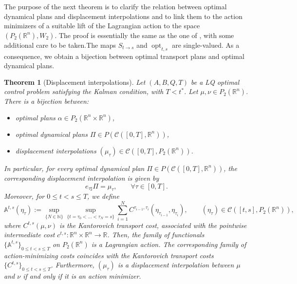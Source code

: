 \documentclass[reqno]{amsart}
\DeclareMathOperator{\opt}{opt}
\theoremstyle{plain}
\newtheorem{thm}{Theorem}[section]
\theoremstyle{definition}
\theoremstyle{remark}
\newcommand{\R}{\mathbb{R}}
\begin{document}
	The purpose of the next theorem is to clarify the relation between optimal dynamical plans and displacement interpolations and to link them to the action minimizers of a suitable lift of the Lagrangian action to the space $(P_2(\mathbb{R}^n),W_2)$. The proof is essentially the same as the one of \cite[Theorem 7.21]{Villanioldandnew}, with some additional care to be taken.The maps $S_{t\to s}$ and $\opt_{t,s}$ are single-valued. As a consequence, we obtain a bijection between optimal transport plans and optimal dynamical plans.
	
	\begin{thm}[Displacement interpolations]\label{dyn_opt_coup_characterization}
		Let $(A,B,Q,T)$ be a LQ optimal control problem satisfying the Kalman condition, with $T<t^*$. Let $\mu, \nu\in P_2(\mathbb{R}^n)$. There is a bijection between:
        \begin{itemize}
            \item optimal plans $\alpha\in P_2(\mathbb{R}^n\times\mathbb{R}^n)$,
            \item optimal dynamical plans $\Pi\in P(\mathcal{C}([0,T],\mathbb{R}^n))$,
            \item displacement interpolations $(\mu_\tau)\in \mathcal{C}([0,T],P_2(\mathbb{R}^n))$.
        \end{itemize}
 In particular, for every optimal dynamical plan $\Pi\in P(\mathcal{C}([0,T],\mathbb{R}^n))$, the corresponding displacement interpolation is given by
		\begin{equation}
			e_{\tau\sharp}\Pi=\mu_\tau,\qquad \forall \tau\in[0,T].
		\end{equation}
		Moreover, for $0\leq t<s\leq T$, we define 
		\begin{equation}
			\mathbb{A}^{t,s}(\eta_{\tau}):=\sup\limits_{\{N\in\mathbb{N}\}}\sup\limits_{\{t=\tau_0<\dots<\tau_N=s\}}\sum_{i=1}^{N}C^{\tau_{i-1},\tau_i}\left(\eta_{\tau_{i-1}},\eta_{\tau_i}\right),\qquad(\eta_{\tau})\in\mathcal{C}([t,s],P_2(\mathbb{R}^n)),
		\end{equation} 
        where $C^{t,s}(\mu,\nu)$ is the Kantorovich transport cost, associated with the pointwise intermediate cost $c^{t,s}:\R^n\times \R^n \to \R$.
		Then, the family of functionals $\{\mathbb{A}^{t,s}\}_{0\leq t<s\leq T}$ on $P_2(\mathbb{R}^n)$ is a Lagrangian action. The corresponding family of action-minimizing costs coincides with the Kantorovich transport costs $\{C^{t,s}\}_{0\leq t<s\leq T}$. Furthermore, $(\mu_\tau)$ is a displacement interpolation between $\mu$ and $\nu$ if and only if it is an action minimizer.
	\end{thm}
\end{document}
